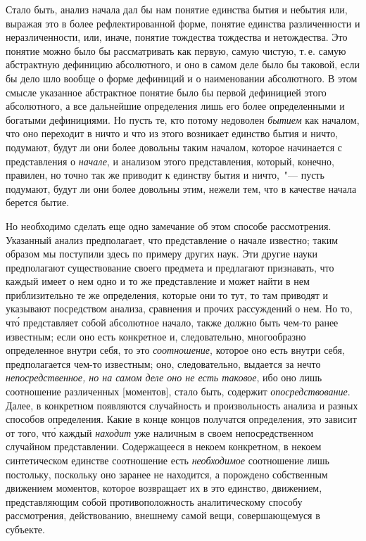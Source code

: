 Стало быть, анализ начала дал бы нам понятие единства
бытия и небытия или, выражая это в более рефлектированной
форме, понятие единства различенности и
неразличенности, или, иначе, понятие тождества тождества
и нетождества\endnotemark{}. Это понятие можно было бы рассматривать
как первую, самую чистую, т.\,е. самую абстрактную
дефиницию абсолютного, и оно в самом деле
было бы таковой, если бы дело шло вообще о форме дефиниций
и о наименовании абсолютного. В этом смысле
указанное абстрактное понятие было бы первой дефиницией
этого абсолютного, а все дальнейшие определения
лишь его более определенными и богатыми дефинициями.
Но пусть те, кто потому недоволен \emph{бытием} как началом,
что оно переходит в ничто и что из этого возникает единство
бытия и ничто, подумают, будут ли они более довольны
таким началом, которое начинается с представления
о \emph{начале}, и анализом этого представления, который,
конечно, правилен, но точно так же приводит
к единству бытия и ничто,~"--- пусть подумают, будут ли
они более довольны этим, нежели тем, что в качестве
начала берется бытие.


Но необходимо сделать еще одно замечание об этом
способе рассмотрения. Указанный анализ предполагает,
что представление о начале известно; таким образом мы
поступили здесь по примеру других наук. Эти другие
науки предполагают существование своего предмета и
предлагают признавать, что каждый имеет о нем одно и
то же представление и может найти в нем приблизительно
те же определения, которые они то тут, то там приводят
и указывают посредством анализа, сравнения и прочих
рассуждений о нем. Но то, чт\'о представляет собой абсолютное
начало, также должно быть чем-то ранее известным;
если оно есть конкретное и, следовательно, многообразно
определенное внутри себя, то это \emph{соотношение},
которое оно есть внутри себя, предполагается чем-то
известным; оно, следовательно, выдается за нечто \emph{непосредственное,
но на самом деле оно не есть таковое}, ибо
оно лишь соотношение различенных [моментов], стало
быть, содержит \emph{опосредствование}. Далее, в конкретном
появляются случайность и произвольность анализа и разных
способов определения. Какие в конце концов получатся
определения, это зависит от того, чт\'о каждый \emph{находит}
уже наличным в своем непосредственном случайном
представлении. Содержащееся в некоем конкретном,
в некоем синтетическом единстве соотношение есть \emph{необходимое}
соотношение лишь постольку, поскольку оно
заранее не находится, а порождено собственным движением
моментов, которое возвращает их в это единство,
движением, представляющим собой противоположность
аналитическому способу рассмотрения, действованию,
внешнему самой вещи, совершающемуся в субъекте.


